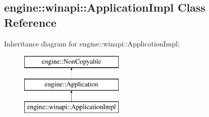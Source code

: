 \hypertarget{a00004}{}\subsection{engine\+:\+:winapi\+:\+:Application\+Impl Class Reference}
\label{a00004}
Inheritance diagram for engine\+:\+:winapi\+:\+:Application\+Impl\+:\begin{figure}[H]
\begin{center}
\leavevmode
\includegraphics[height=3.000000cm]{a00004}
\end{center}
\end{figure}
